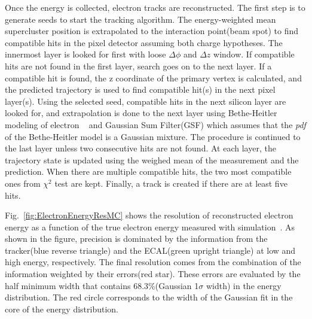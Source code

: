 Once the energy is collected, electron tracks are reconstructed. The first step is 
to generate seeds to start the tracking algorithm. The energy-weighted mean 
supercluster position is extrapolated to the interaction point(beam spot) 
to find compatible hits in the pixel detector assuming both charge hypotheses. 
The innermost layer is looked for first with loose $\Delta\phi$ and $\Delta z$ window. 
If compatible hits are not found in the first layer, search goes on to the next layer. 
If a compatible hit is found, the z coordinate of the primary vertex is calculated,
and the predicted trajectory is used to find compatible hit(s) in the next pixel layer(s).  
Using the selected seed, compatible hits in the next silicon layer are looked for,  
and extrapolation is done to the next layer using Bethe-Heitler modeling of electron 
\brem~\cite{BetheHeitler} 
and Gaussian Sum Filter(GSF) \cite{0954-3899-31-9-N01} which assumes that the \textit{pdf} 
of the Bethe-Heitler model is a Gaussian mixture. 
The procedure is continued to the last layer unless two consecutive hits are not found. 
At each layer, the trajectory state is updated using the weighed mean of the measurement 
and the prediction. When there are multiple compatible hits, the two most compatible ones 
from $\chi^2$ test are kept. Finally, a track is created if there are at least five hits. 

Fig.~\ref{fig:ElectronEnergyResMC} shows the resolution of reconstructed electron energy 
as a function of the true electron energy measured with simulation~\cite{PAS-HIG-13-002}.   
As shown in the figure, precision is dominated by the information 
from the tracker(blue reverse triangle) and the ECAL(green upright triangle) 
at low and high energy, respectively. 
The final resolution comes from the combination of the information weighted by 
their errors(red star). These errors are evaluated by the half minimum width that 
contains 68.3\%(Gaussian 1$\sigma$ width) in the energy distribution. 
The red circle corresponds to the width of the Gaussian fit in the core of the 
energy distribution. 

